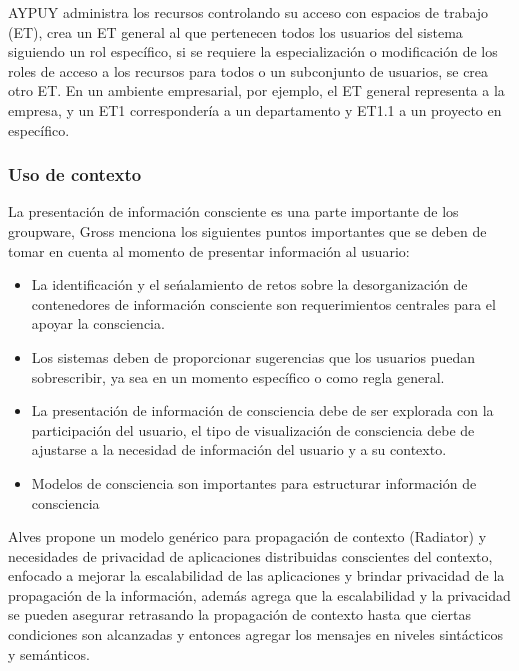 AYPUY administra los recursos controlando su acceso con espacios de trabajo (ET), crea un ET general al que pertenecen todos los usuarios del sistema siguiendo un rol espec\'ifico, si se requiere la especializaci\'on o modificaci\'on de los roles de acceso a los recursos para todos o un subconjunto de usuarios, se crea otro ET. En un ambiente empresarial, por ejemplo, el ET general representa a la empresa, y un ET1 corresponder\'ia a un departamento y ET1.1 a un proyecto en espec\'ifico.

\subsubsection{Uso de contexto}
La presentaci\'on de informaci\'on consciente es una parte importante de los groupware, Gross\cite{gross2013supporting} menciona los siguientes puntos importantes que se deben de tomar en cuenta al momento de presentar informaci\'on al usuario:
\begin{itemize}
\item La identificaci\'on y el se\'nalamiento de retos sobre la desorganizaci\'on de contenedores de informaci\'on consciente son requerimientos centrales para el apoyar la consciencia.
\item Los sistemas deben de proporcionar sugerencias que los usuarios puedan sobrescribir, ya sea en un momento espec\'ifico o como regla general.
\item La presentaci\'on de informaci\'on de consciencia debe de ser explorada con la participaci\'on del usuario, el tipo de visualizaci\'on de consciencia debe de ajustarse a la necesidad de informaci\'on del usuario y a su contexto.
\item Modelos de consciencia son importantes para estructurar informaci\'on de consciencia
\end{itemize}
Alves \cite{alves2013radiator} propone un modelo gen\'erico para propagaci\'on de contexto (Radiator) y necesidades de privacidad de aplicaciones distribuidas conscientes del contexto, enfocado a mejorar la escalabilidad de las aplicaciones y brindar privacidad de la propagaci\'on de la informaci\'on, adem\'as agrega que la escalabilidad y la privacidad se pueden asegurar retrasando la propagaci\'on de contexto hasta que ciertas condiciones son alcanzadas y entonces agregar los mensajes en niveles sint\'acticos y sem\'anticos.

